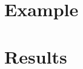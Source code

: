 \documentclass[a4paper]{report}
\begin{document}
\chapter{Example}
\label{chap: Example}


%
%
%

\chapter{Results}

 

{}


%
\nocite{*}

\newpage{\pagestyle{empty} \cleardoublepage}
\listoftodos
\end{document}
